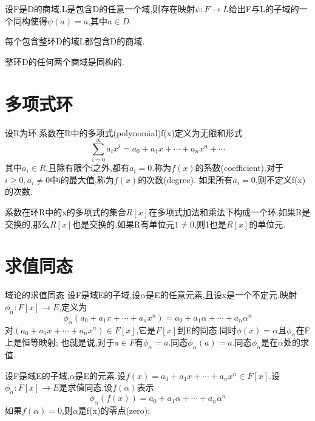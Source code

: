 \documentclass[oneside,openany]{ctexbook}
\begin{document}
\begin{definition}{}{}
设F是D的商域,L是包含D的任意一个域,则存在映射$\psi :F\rightarrow L$给出F与L的子域的一个同构使得$\psi (a)=a$,其中$a\in D$.
\end{definition}

\begin{definition}{}{}
每个包含整环D的域L都包含D的商域.
\end{definition}

\begin{definition}{}{}
整环D的任何两个商域是同构的.
\end{definition}

\section{多项式环}

\begin{definition}{}{}
设R为环.系数在R中的多项式\textnormal{(polynomial)}f(x)定义为无限和形式$$\sum_{i=0}^{\infty}a_ix^i=a_0+a_1x+\cdots +a_nx^n +\cdots$$
其中$a_i\in R$,且除有限个i之外,都有$a_i=0$.称为$f(x)$的系数\textnormal{(coefficient)}.对于$i\geq 0,a_i \neq 0$中i的最大值,称为$f(x)$的次数\textnormal{(degree)}.
如果所有$a_i=0$,则不定义f(x)的次数.
\end{definition}

\begin{definition}{}{}
系数在环R中的x的多项式的集合$R[x]$在多项式加法和乘法下构成一个环.如果R是交换的,那么$R[x]$也是交换的.如果R有单位元$1\neq 0$,则1也是$R[x]$的单位元.
\end{definition}

\section{求值同态}

\begin{definition}{域论的求值同态}{}
设F是域E的子域,设$\alpha $是E的任意元素,且设x是一个不定元.映射$\phi _{\alpha}:F[x]\rightarrow E$,定义为
$$\phi _{\alpha}(a_0+a_1x+\cdots +a_nx^n)=a_0+a_1\alpha+ \cdots +a_n\alpha^n$$
对$(a_0+a_1x+\cdots +a_nx^n)\in F[x]$,它是$F[x]$到E的同态.同时$\phi (x)=\alpha$且$\phi_{\alpha}$在F上是恒等映射;
也就是说,对于$a\in F$有$\phi_{\alpha}=a$.同态$\phi _\alpha(a)=a$.同态$\phi _\alpha$是在$\alpha$处的求值.
\end{definition}

\begin{definition}{}{}
设F是域E的子域,$\alpha$是E的元素.设$f(x)=a_0+a_1x+\cdots +a_nx^n\in F[x]$.设$\phi _{\alpha}:F[x]\rightarrow E$是求值同态.设$f(\alpha)$表示
$$\phi _{\alpha}(f(x))=a_0+a_1\alpha+\cdots +a_n\alpha^n$$
如果$f(\alpha)=0$,则$\alpha$是f(x)的零点\textnormal{(zero)};
\end{definition}
\end{document}
